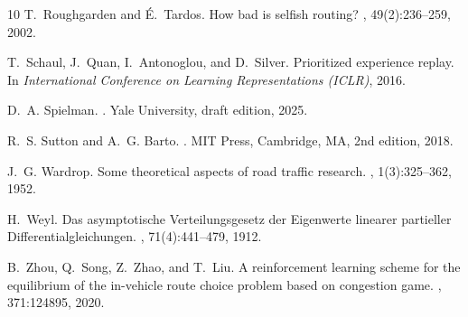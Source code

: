 \documentclass[11pt,a4paper]{article}
\begin{document}
\begin{thebibliography}{10}
T.~Roughgarden and {\'E}.~Tardos.
\newblock How bad is selfish routing?
, 49(2):236--259, 2002.

T.~Schaul, J.~Quan, I.~Antonoglou, and D.~Silver.
\newblock Prioritized experience replay.
\newblock In {\em International Conference on Learning Representations (ICLR)}, 2016.

D.~A. Spielman.
.
\newblock Yale University, draft edition, 2025.

R.~S. Sutton and A.~G. Barto.
.
\newblock MIT Press, Cambridge, MA, 2nd edition, 2018.

J.~G. Wardrop.
\newblock Some theoretical aspects of road traffic research.
, 1(3):325--362, 1952.

H.~Weyl.
\newblock Das asymptotische {V}erteilungsgesetz der {E}igenwerte linearer partieller {D}ifferentialgleichungen.
, 71(4):441--479, 1912.

B.~Zhou, Q.~Song, Z.~Zhao, and T.~Liu.
\newblock A reinforcement learning scheme for the equilibrium of the in-vehicle route choice problem based on congestion game.
, 371:124895, 2020.

\end{thebibliography}
\end{document}
